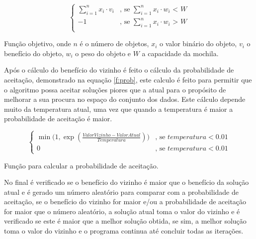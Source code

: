 \begin{mycapequ}[!ht]
\begin{equation}
\label{f:objetivo}
 \begin{cases}
      \sum_{i=1}^{n} x_i \cdot v_i & \text{, se $\sum_{i=1}^{n} x_i \cdot w_i$ < $W$}\\
      -1 & \text{, se $\sum_{i=1}^{n} x_i \cdot w_i$ > $W$}\\
\end{cases}
\end{equation}
  \caption{Função objetivo, onde $n$ é o número de objetos, $x_i$ o valor binário do objeto, $v_i$ o benefício do objeto, $w_i$ o peso do objeto e $W$ a capacidade da mochila.}
\end{mycapequ}

Após o cálculo do benefício do vizinho é feito o cálculo da probabilidade de aceitação, demonstrado na equação \ref{f:prob}, este calculo é feito para permitir que o algoritmo possa aceitar soluções piores que a atual para o propósito de melhorar a sua procura no espaço do conjunto dos dados. Este cálculo depende muito da temperatura atual, uma vez que quando a temperatura é maior a probabilidade de aceitação é maior.

\begin{mycapequ}[!ht]
\begin{equation}
\label{f:prob}
 \begin{cases}
      \min\bigl( 1,\exp(\frac{ValorVizinho - ValorAtual}{Temperatura}) \bigl) & \text{, se $temperatura < 0.01$}\\
      0 & \text{, se $temperatura < 0.01$}
\end{cases} 
\end{equation}
\caption{Função para calcular a probabilidade de aceitação.}
\end{mycapequ}

No final é verificado se o benefício do vizinho é maior que o benefício da solução atual e é gerado um número aleatório para comparar com a probabilidade de aceitação, se o benefício do vizinho for maior e/ou a probabilidade de aceitação for maior que o número aleatório, a solução atual toma o valor do vizinho e é verificado se este é maior que a melhor solução obtida, se sim, a melhor solução toma o valor do vizinho e o programa continua até concluir todas as iterações.


